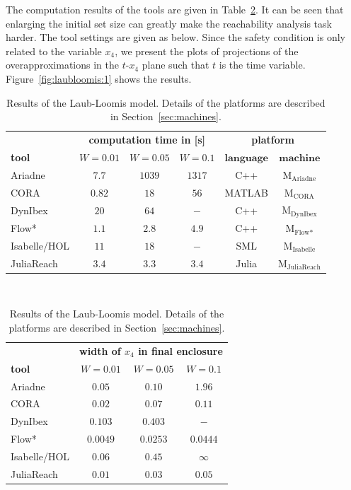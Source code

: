 \documentclass[EPiC]{easychair}
\begin{document}
The computation results of the tools are given in Table~\ref{tab:compTimes:laubloomis}. It can be seen that enlarging the initial set size can greatly make the reachability analysis task harder. The tool settings are given as below. Since the safety condition is only related to the variable $x_4$, we present the plots of projections of the overapproximations in the $t$-$x_4$ plane such that $t$ is the time variable. Figure~\ref{fig:laubloomis:1} shows the results.

\begin{table}[t]
	\setlength{\tabcolsep}{4pt}
	\renewcommand{\arraystretch}{1.2}
	\centering
	\caption{Results of the Laub-Loomis model. Details of the platforms are described in Section~\ref{sec:machines}.}
	\begin{tabular}[c]{lccccc}
	\hline
		 & \multicolumn{3}{c}{\textbf{computation time in [s]}} & \multicolumn{2}{c}{\textbf{platform}} \\ \cmidrule(l){2-4} \cmidrule(l){5-6}
		 \textbf{tool} & \textbf{$W=0.01$} & \textbf{$W=0.05$} & \textbf{$W=0.1$} & $\textbf{language}$ & $\textbf{machine}$ \\ \hline
		 Ariadne & $7.7$ & $1039$ & $1317$ & C++ & M$_{\text{Ariadne}}$ \\
         CORA & $0.82$ & $18$ & $56$ & MATLAB & M$_{\text{CORA}}$ \\
         DynIbex & $20$ & $64$ & $-$ & C++ & M$_{\text{DynIbex}}$ \\
         Flow* & $1.1$ & $2.8$ & $4.9$ & C++ & M$_{\text{Flow*}}$ \\
         Isabelle/HOL & $11$ & $18$ & $-$ & SML & M$_{\text{Isabelle}}$ \\
         JuliaReach & $3.4$ & $3.3$ & $3.4$ & Julia & M$_{\text{JuliaReach}}$ \\
		 \hline
	\end{tabular} \\[1em]
	\begin{tabular}[c]{lccc}
	\hline
		 & \multicolumn{3}{c}{\textbf{width of $x_4$ in final enclosure}}\\
		 \cmidrule(l){2-4}
		 \textbf{tool} & \textbf{$W=0.01$} & \textbf{$W=0.05$} & \textbf{$W=0.1$} \\ \hline
		 Ariadne & $0.05$ & $0.10$ & $1.96$ \\
         CORA & $0.02$ & $0.07$ & $0.11$\\
         DynIbex & $0.103$ & $ 0.403$ & $-$\\
         Flow* & $0.0049$ & $0.0253$ & $0.0444$ \\
         Isabelle/HOL & $0.06$ & $0.45$ & $\infty$ \\
         JuliaReach & $0.01$ & $0.03$ & $0.05$ \\
		 \hline
	\end{tabular}
	\label{tab:compTimes:laubloomis}
\end{table}
\end{document}
